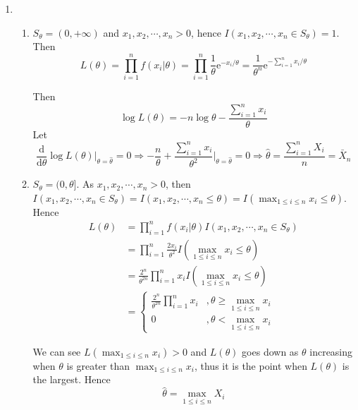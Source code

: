 \documentclass{article}
\begin{document}
\begin{enumerate}[leftmargin = 0 em, label = \arabic*., font = \bfseries]
	
	\item 
	\begin{enumerate}
		\item 
		$S_\theta = (0, + \infty)$ and $x_1, x_2, \cdots , x_n >0$, hence $I(x_1, x_2, \cdots , x_n \in S_\theta) = 1$. Then
		\[L(\theta) = \prod_{i=1}^n f(x_i | \theta) = \prod_{i=1}^n \frac{1}{\theta}\mathrm{e}^{-x_i / \theta} = \frac{1}{\theta^n} \mathrm{e}^{-\sum_{i=1}^n x_i / \theta} \]

		Then 
		\[\log L(\theta) = - n \log \theta - \frac{\sum_{i=1}^n x_i}{\theta}\]
		Let 
		\[\frac{\mathrm{d}}{\mathrm{d}\theta}\log L({\theta}) \bigg|_{\theta = \hat{\theta}} = 0 \Rightarrow - \frac{n}{\theta} + \frac{\sum_{i=1}^n x_i}{\theta^2} \bigg|_{\theta = \hat{\theta}} = 0 \Rightarrow \hat{\theta} = 	\frac{\sum_{i=1}^n X_i}{n} =  \bar{X}_n \]

		\item 
		$S_\theta = (0, \theta]$. As $x_1, x_2, \cdots, x_n >0$, then 
		$I(x_1, x_2, \cdots, x_n \in S_\theta) = I(x_1, x_2, \cdots, x_n \leq \theta) = I(\max_{1\leq i \leq n} x_i \leq \theta)$. Hence
		\begin{align*}
		L(\theta) & = \prod_{i=1}^n f(x_i | \theta) I(x_1, x_2, \cdots, x_n \in S_\theta)\\
		& = \prod_{i=1}^n \frac{2 x_i}{\theta^2} I(\max_{1 \leq i \leq n}x_i \leq \theta)\\
		& = \frac{2^n}{\theta^{2n}} \prod_{i=1}^n x_i I(\max_{1 \leq i \leq n}x_i \leq \theta) \\
		& = \begin{cases}
			\frac{2^n}{\theta^{2n}} \prod_{i=1}^n x_i & ,\theta \geq \max_{1 \leq i \leq n} x_i\\
			0 & , \theta < \max_{1 \leq i \leq n} x_i
		\end{cases}
				\end{align*}
		
		We can see $L(\max_{1 \leq i \leq n} x_i) > 0$ and $L(\theta)$ goes down as $\theta$ increasing when $\theta$ is greater than $\max_{1 \leq i \leq n} x_i$, thus it is the point when $L(\theta)$ is the largest. Hence
		\[\hat{\theta} = \max_{1 \leq i \leq n} X_i\]
	\end{enumerate}


\end{enumerate}
\end{document}

